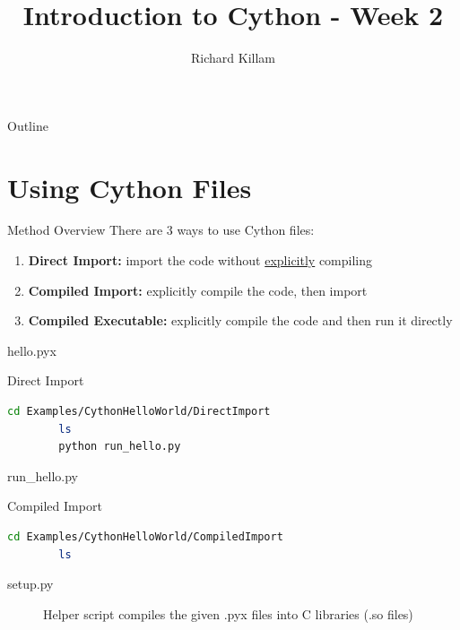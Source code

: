 \documentclass[11pt]{beamer}
\author{Richard Killam}
\title{Introduction to Cython - Week 2}
\begin{document}
\centering

\begin{frame}
	\titlepage
\end{frame}

\begin{frame}{Outline}
	\begin{multicols}{2}
		\tableofcontents
	\end{multicols}
\end{frame}

\section{Using Cython Files}
\begin{frame}[fragile]{Method Overview}
	There are 3 ways to use Cython files:
	\begin{enumerate}[<+->]
		\item \textbf{Direct Import:} import the code without \underline{explicitly} compiling
		\item \textbf{Compiled Import:} explicitly compile the code, then import
		\item \textbf{Compiled Executable:} explicitly compile the code and then run it directly
	\end{enumerate}
	
	\pause[\thebeamerpauses]
	hello.pyx
	
\end{frame}

\begin{frame}[fragile]{Direct Import}
	\begin{lstlisting}[language=Bash]
		cd Examples/CythonHelloWorld/DirectImport
		ls
		python run_hello.py
	\end{lstlisting}
	\pause
	run\_hello.py
	
\end{frame}

\begin{frame}[fragile]{Compiled Import}
	\begin{lstlisting}[language=Bash]
		cd Examples/CythonHelloWorld/CompiledImport
		ls
	\end{lstlisting}
	
	\begin{description}
		\item[setup.py] Helper script compiles the given .pyx files into C libraries (.so files)
		
	\end{description}
\end{frame}
\end{document}
